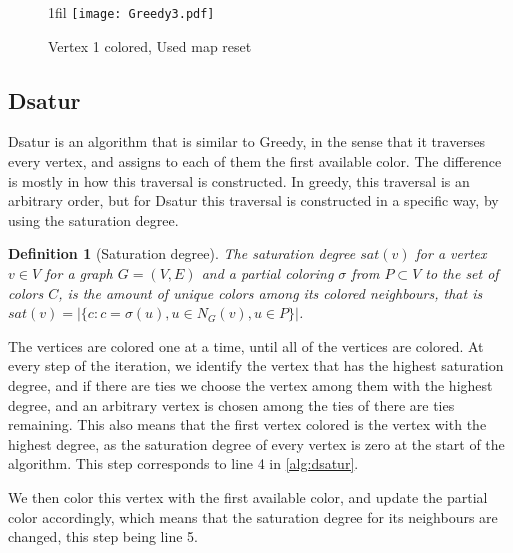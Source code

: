 \documentclass[a4paper]{article}
\makeatletter
\newtheorem{definition}{Definition}[section]
\newcommand*{\centerfloat}{%
  \parindent \z@
  \leftskip \z@ \@plus 1fil \@minus \textwidth
  \rightskip\leftskip
  \parfillskip \z@skip}
\makeatother
\begin{document}
\begin{figure}[H]
    \centerfloat
    \texttt{[image: Greedy3.pdf]}
    \caption{Vertex 1 colored, Used map reset}
    \label{fig:greedy3}
\end{figure}

\FloatBarrier
\subsection{Dsatur}

Dsatur is an algorithm that is similar to Greedy, in the sense that it
traverses every vertex, and assigns to each of them the first available color.
The difference is mostly in how this traversal is constructed. In greedy, this
traversal is an arbitrary order, but for Dsatur this traversal is constructed
in a specific way, by using the saturation degree.

\begin{definition}[Saturation degree]{\cite{Constructive}}
    The saturation degree $sat(v)$ for a vertex $v \in V$ for a graph $G =
    (V,E)$ and a partial coloring $\sigma$ from $P \subset V$ to the set of colors $C$, is the amount of unique colors among
    its colored neighbours, that is $sat(v) = |\{c  : c = \sigma(u), u \in N_G(v),u \in P  \}|$.
\end{definition}

The vertices are colored one at a time, until all of the vertices are colored.
At every step of the iteration, we identify the vertex that has the highest
saturation degree, and if there are ties we choose the vertex among them with
the highest degree, and an arbitrary vertex is chosen among the ties of there
are ties remaining.  This also means that the first vertex colored is the
vertex with the highest degree, as the saturation degree of every vertex is
zero at the start of the algorithm. This step corresponds to line 4 in 
\autoref{alg:dsatur}.

We then color this vertex with the first available
color, and update the partial color accordingly, which means that the
saturation degree for its neighbours are changed, this step being line 5.
\end{document}
